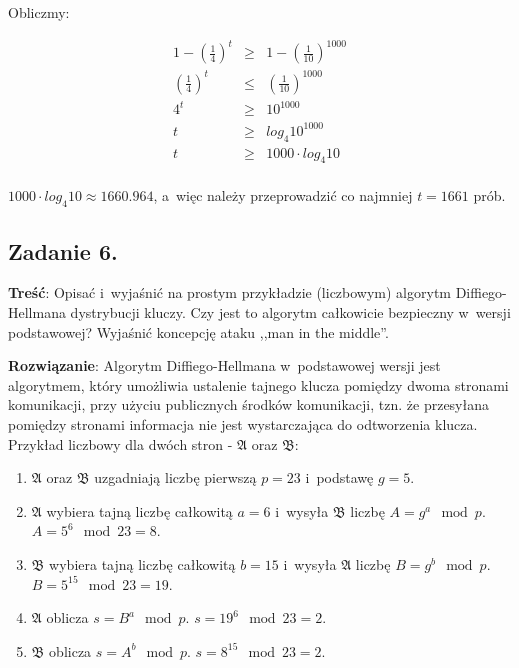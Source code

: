 \documentclass[a4paper,10pt, twocolumn]{article}
\begin{document}
\noindent Obliczmy:

\begin{equation*}
	\begin{array}{lcl}
		1 - (\frac{1}{4})^{t} & \geq & 1 - (\frac{1}{10})^{1000} \\ 
		(\frac{1}{4})^{t} & \leq & (\frac{1}{10})^{1000} \\ 
		4^{t} & \geq & 10^{1000} \\
		t & \geq & log_{4}{10^{1000}} \\
		t & \geq & 1000 \cdot log_{4}{10} \\
	\end{array}
\end{equation*}

\noindent $1000 \cdot log_{4}{10} \approx 1660.964$, a~więc należy przeprowadzić co najmniej $t = 1661$ prób.

\subsection{Zadanie 6.}
\textbf{Treść}: Opisać i~wyjaśnić na prostym przykładzie (liczbowym) algorytm Diffiego-Hellmana dystrybucji kluczy. Czy jest to algorytm całkowicie bezpieczny w~wersji podstawowej? Wyjaśnić koncepcję ataku ,,man in the middle''.

\textbf{Rozwiązanie}: Algorytm Diffiego-Hellmana w~podstawowej wersji jest algorytmem, który umożliwia ustalenie tajnego klucza pomiędzy dwoma stronami komunikacji, przy użyciu publicznych środków komunikacji, tzn. że przesyłana pomiędzy stronami informacja nie jest wystarczająca do odtworzenia klucza. Przykład liczbowy dla dwóch stron - $\mathfrak{A}$ oraz $\mathfrak{B}$:

\begin{enumerate}
 \item $\mathfrak{A}$ oraz $\mathfrak{B}$ uzgadniają liczbę pierwszą $p=23$ i~podstawę $g=5$.
 \item $\mathfrak{A}$ wybiera tajną liczbę całkowitą $a=6$ i~wysyła $\mathfrak{B}$ liczbę $A = g^{a} \mod p$. $A = 5^{6} \mod 23 = 8$.
 \item $\mathfrak{B}$ wybiera tajną liczbę całkowitą $b=15$ i~wysyła $\mathfrak{A}$ liczbę $B = g^{b} \mod p$. $B = 5^{15} \mod 23 = 19$.
 \item $\mathfrak{A}$ oblicza $s = B^{a} \mod p$. $s = 19^{6} \mod 23 = 2$.
 \item $\mathfrak{B}$ oblicza $s = A^{b} \mod p$. $s = 8^{15} \mod 23 = 2$.
\end{enumerate}
\end{document}
